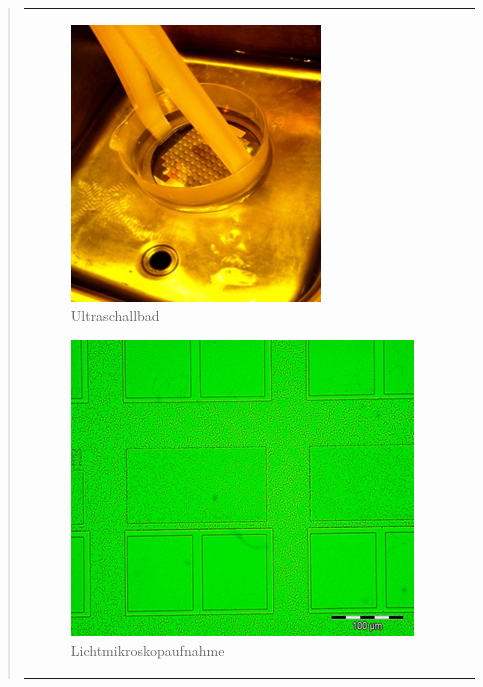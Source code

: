\begin{quote}
\begin{center}
\begin{tabular}{ll}
                \hspace{-14em}
                    \begin{minipage}{0.7\textwidth}
                        \begin{figure}[H]
                        \hspace{7.7em}
                            \includegraphics[scale=1, trim = 0cm 0cm 0cm
                            0cm, clip]{./HerstellungBilder/Ultraschalbad.png}
                            \caption{Ultraschallbad}
                           \label{fig:ultra}
                        \end{figure}

                    \end{minipage}
                    \begin{minipage}{0.5\textwidth}

                        \begin{figure}[H]
                        \hspace{0em}
                            \includegraphics[scale=0.9, trim = 0cm 0cm 0cm
                            0cm, clip]
                            {./HerstellungBilder/LichtmikroskopbildEndstruktur.png}
                            \caption{Lichtmikroskopaufnahme}
                           \label{fig:auflicht}
                        \end{figure}
                    \vspace{-1.5em}


\end{minipage}
\end{tabular}
\end{center}
\end{quote}

